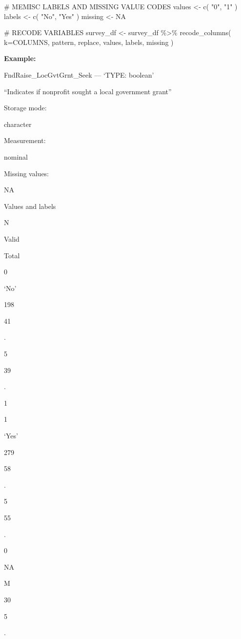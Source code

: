 \documentclass[
  letterpaper,
]{scrbook}
\newenvironment{Shaded}{\begin{snugshade}}{\end{snugshade}}
\newcommand{\AttributeTok}[1]{\textcolor[rgb]{0.40,0.45,0.13}{#1}}
\newcommand{\CommentTok}[1]{\textcolor[rgb]{0.37,0.37,0.37}{#1}}
\newcommand{\ConstantTok}[1]{\textcolor[rgb]{0.56,0.35,0.01}{#1}}
\newcommand{\FunctionTok}[1]{\textcolor[rgb]{0.28,0.35,0.67}{#1}}
\newcommand{\NormalTok}[1]{\textcolor[rgb]{0.00,0.23,0.31}{#1}}
\newcommand{\OtherTok}[1]{\textcolor[rgb]{0.00,0.23,0.31}{#1}}
\newcommand{\SpecialCharTok}[1]{\textcolor[rgb]{0.37,0.37,0.37}{#1}}
\newcommand{\StringTok}[1]{\textcolor[rgb]{0.13,0.47,0.30}{#1}}
\begin{document}
\begin{Shaded}
\begin{Highlighting}[]
\CommentTok{\# MEMISC LABELS AND MISSING VALUE CODES }
\NormalTok{values  }\OtherTok{\textless{}{-}} \FunctionTok{c}\NormalTok{( }\StringTok{"0"}\NormalTok{, }\StringTok{"1"}\NormalTok{ )}
\NormalTok{labels  }\OtherTok{\textless{}{-}} \FunctionTok{c}\NormalTok{( }\StringTok{"No"}\NormalTok{, }\StringTok{"Yes"}\NormalTok{ )}
\NormalTok{missing }\OtherTok{\textless{}{-}} \ConstantTok{NA}

\CommentTok{\# RECODE VARIABLES }
\NormalTok{survey\_df }\OtherTok{\textless{}{-}} 
\NormalTok{  survey\_df }\SpecialCharTok{\%\textgreater{}\%} 
  \FunctionTok{recode\_columns}\NormalTok{( }\AttributeTok{k=}\NormalTok{COLUMNS, pattern, replace, values, labels, missing )}
\end{Highlighting}
\end{Shaded}

\textbf{Example:}

FndRaise\_LocGvtGrnt\_Seek --- {`TYPE: boolean'}

``Indicates if nonprofit sought a local government grant''

Storage mode:

character

Measurement:

nominal

Missing values:

NA

Values and labels

N

Valid

Total

0

`No'

198

41

.

5

39

.

1

1

`Yes'

279

58

.

5

55

.

0

NA

M

30

5

.
\end{document}

